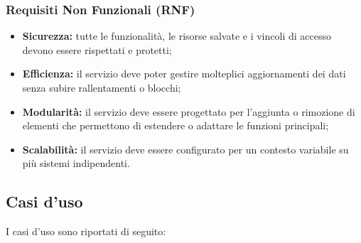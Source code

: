 \subsubsection{Requisiti Non Funzionali (RNF)}
\begin{itemize}
    \item \textbf{Sicurezza:} tutte le funzionalità, le risorse salvate e i vincoli di accesso devono essere rispettati e protetti;
    \item \textbf{Efficienza:} il servizio deve poter gestire molteplici aggiornamenti dei dati senza subire rallentamenti o blocchi;
    \item \textbf{Modularità:} il servizio deve essere progettato per l'aggiunta o rimozione di elementi che permettono di estendere o adattare le funzioni principali; 
    \item \textbf{Scalabilità:} il servizio deve essere configurato per un contesto variabile su più sistemi indipendenti.
\end{itemize}

\subsection{Casi d'uso}
I casi d'uso sono riportati di seguito:

